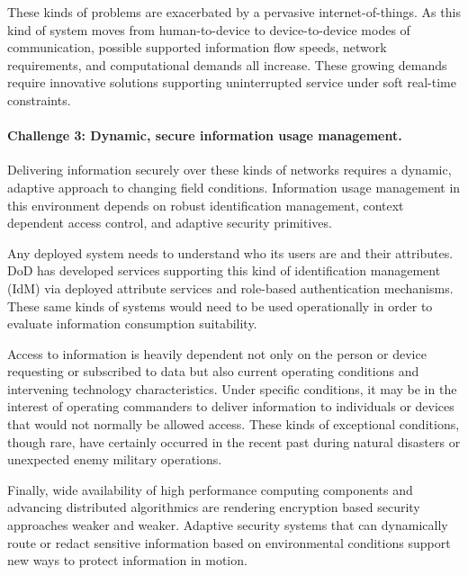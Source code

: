 \documentclass{sbir}
\begin{document}
These kinds of problems are exacerbated by a pervasive internet-of-things.  As this kind of system moves from human-to-device to device-to-device modes of communication, possible supported information flow speeds, network requirements, and computational demands all increase.  These growing demands require innovative solutions supporting uninterrupted service under soft real-time constraints.

\paragraph{Challenge 3: Dynamic, secure information usage management.}  Delivering information securely over these kinds of networks requires a dynamic, adaptive approach to changing field conditions.  Information usage management in this environment depends on robust identification management, context dependent access control, and adaptive security primitives.

Any deployed system needs to understand who its users are and their attributes.  DoD has developed services supporting this kind of identification management (IdM) via deployed attribute services and role-based authentication mechanisms.  These same kinds of systems would need to be used operationally in order to evaluate information consumption suitability.

Access to information is heavily dependent not only on the person or device requesting or subscribed to data but also current operating conditions and intervening technology characteristics.  Under specific conditions, it may be in the interest of operating commanders to deliver information to individuals or devices that would not normally be allowed access.  These kinds of exceptional conditions, though rare, have certainly occurred in the recent past during natural disasters or unexpected enemy military operations.

Finally, wide availability of high performance computing components and advancing distributed algorithmics are rendering encryption based security approaches weaker and weaker.  Adaptive security systems that can dynamically route or redact sensitive information based on environmental conditions support new ways to protect information in motion.
\end{document}
